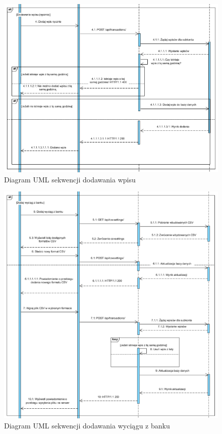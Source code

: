 \documentclass{article}
\begin{document}
	\begin{figure}[H]

		\hspace*{-1.5cm}
		\includegraphics[scale=0.8]{assets/sq4.png}
		\caption[]{Diagram UML sekwencji dodawania wpisu}
		\label{fig:umlwpr}
	\end{figure}
	\begin{figure}[H]

		\hspace*{-1.5cm}
		\includegraphics[scale=0.9]{assets/sq5.png}
		\caption[]{Diagram UML sekwencji dodawania wyciągu z banku}
		\label{fig:umlwpb}
	\end{figure}
\end{document}

